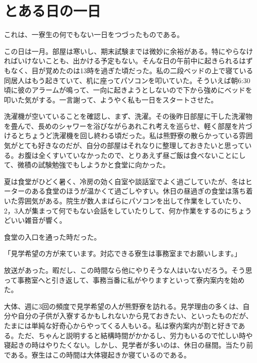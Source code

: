 \section{とある日の一日}
\vspace{2mm}
これは、一寮生の何でもない一日をつづったものである。

\par
この日は一月。部屋は寒いし、期末試験までは微妙に余裕がある。特にやらなければいけないことも、出かける予定もない。そんな日の午前中に起きられるはずもなく、目が覚めたのは13時を過ぎた頃だった。私の二段ベッドの上で寝ている同居人はもう起きていて、机に座ってパソコンを叩いていた。そういえば朝6:30頃に彼のアラームが鳴って、一向に起きようとしないので下から強めにベッドを叩いた気がする。一言謝って、ようやく私も一日をスタートさせた。

\par
洗濯機が空いていることを確認し、まず、洗濯。その後昨日部屋に干した洗濯物を畳んで、長めのシャワーを浴びながらあれこれ考えを巡らせ、軽く部屋を片づけるとちょうど洗濯機を回し終わる頃だった。私は熊野寮の散らかっている雰囲気がとても好きなのだが、自分の部屋はそれなりに整理しておきたいと思っている。お腹は全くすいていなかったので、とりあえず昼ご飯は食べないことにして、微積の試験勉強でもしようかと食堂に向かった。

\par
夏は食堂がひどく暑く、冷房の効く自室や談話室でよく過ごしていたが、冬はヒーターのある食堂のほうが温かくて過ごしやすい。休日の昼過ぎの食堂は落ち着いた雰囲気がある。院生が数人まばらにパソコンを出して作業をしていたり、2，3人が集まって何でもない会話をしていたりして、何か作業をするのにちょうどいい雑音が響く。

\par
食堂の入口を通った時だった。\par 「見学希望の方が来ています。対応できる寮生は事務室までお願いします。」\par 放送があった。暇だし、この時間なら他にやりそうな人はいないだろう。そう思って事務室へと引き返して、事務当番に私がやりますといって寮内案内を始めた。

\par
大体、週に3回の頻度で見学希望の人が熊野寮を訪れる。見学理由の多くは、自分や自分の子供が入寮するかもしれないから見ておきたい、といったものだが、たまには単純な好奇心からやってくる人もいる。私は寮内案内が割と好きである。ただ、ちゃんと説明すると結構時間がかかるし、労力もいるので忙しい時や寝起きの時はやりたくない。しかし、見学者が多いのは、休日の昼間。当たり前である。寮生はこの時間は大体寝起きか寝ているのである。

